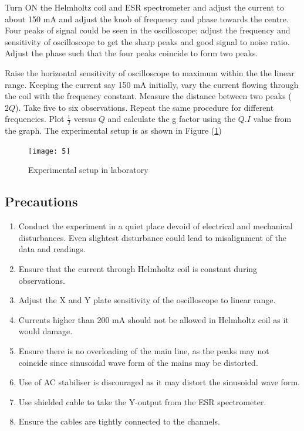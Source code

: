 \documentclass[a4paper, amsfonts, amssymb, amsmath, reprint, showkeys, nofootinbib, twoside]{revtex4-1}
\begin{document}
Turn ON the Helmholtz coil and ESR spectrometer and adjust the current to about 150 mA and adjust the knob of frequency and phase towards the centre. Four peaks of signal could be seen in the oscilloscope; adjust the frequency and sensitivity of oscilloscope to get the sharp peaks and good signal to noise ratio. Adjust the phase such that the four peaks coincide to form two peaks. 

Raise the horizontal sensitivity of oscilloscope to maximum within the the linear range. Keeping the current say 150 mA initially, vary the current flowing through the coil with the frequency constant. Measure the distance between two peaks ($2Q$). Take five to six observations. Repeat the same procedure for different frequencies. Plot $\frac{1}{I}$ versus $Q$ and calculate the g factor using the $Q.I$ value from the graph. The experimental setup is as shown in Figure (\ref{setup})

\begin{figure}[htbp] %
   \centering
   \texttt{[image: 5]} 
   \caption{Experimental setup in laboratory}
   \label{setup}
\end{figure}

\subsection{Precautions}
\begin{enumerate}
\item{Conduct the experiment in a quiet place devoid of electrical and mechanical disturbances. Even slightest disturbance could lead to misalignment of the data and readings.}
\item{Ensure that the current through Helmholtz coil is constant during observations.}
\item{Adjust the X and Y plate sensitivity of the oscilloscope to linear range.}
\item{Currents higher than 200 mA should not be allowed in Helmholtz coil as it would damage.}
\item{Ensure there is no overloading of the main line, as the peaks may not coincide since sinusoidal wave form of the mains may be distorted.}
\item{Use of AC stabiliser is discouraged as it may distort the sinusoidal wave form.}
\item{Use shielded cable to take the Y-output from the ESR spectrometer.}
\item{Ensure the cables are tightly connected to the channels.}
\end{enumerate}
\end{document}
